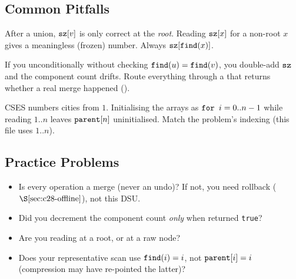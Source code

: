 \subsection{Common Pitfalls}

\begin{warningbox}
After a union, \(\texttt{sz}[v]\) is only correct at the \emph{root}.  Reading
\(\texttt{sz}[x]\) for a non-root \(x\) gives a meaningless (frozen) number.
Always \(\texttt{sz}[\texttt{find}(x)]\).
\end{warningbox}

\begin{warningbox}
If you  unconditionally without checking \(\texttt{find}(u)=\texttt{find}(v)\),
you double-add \(\texttt{sz}\) and the component count drifts.  Route everything
through a  that returns whether a real merge happened
().
\end{warningbox}

\begin{warningbox}
CSES numbers cities from \(1\).  Initialising the arrays as
\(\texttt{for }i=0..n-1\) while reading \(1..n\) leaves \(\texttt{parent}[n]\)
uninitialised.  Match the problem's indexing (this file uses \(1..n\)).
\end{warningbox}

\subsection{Practice Problems}

\begin{stuckbox}
\begin{itemize}[nosep, leftmargin=1.4em]
  \item Is every operation a merge (never an undo)?  If not, you need rollback
        (\(\secref{c28-offline}\)), not this DSU.
  \item Did you decrement the component count \emph{only} when 
        returned \texttt{true}?
  \item Are you reading  at a root, or at a raw node?
  \item Does your representative scan use \(\texttt{find}(i)=i\), not
        \(\texttt{parent}[i]=i\) (compression may have re-pointed the latter)?
\end{itemize}
\end{stuckbox}

